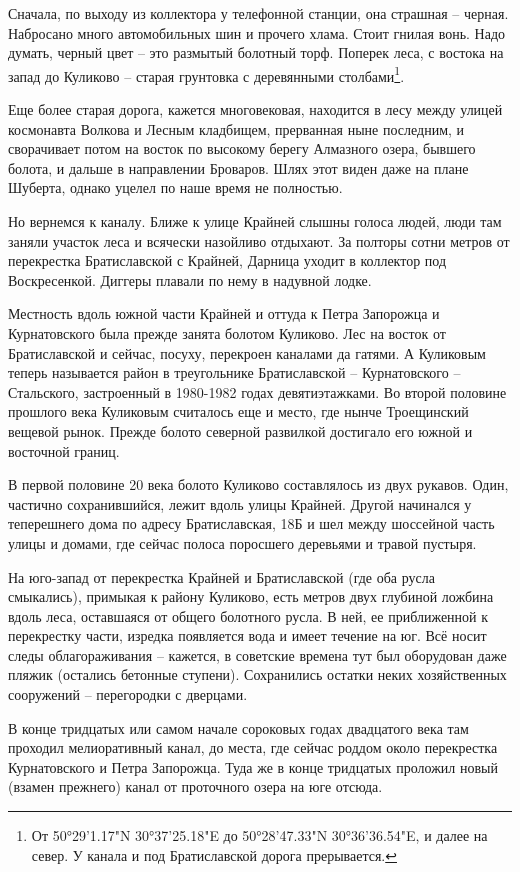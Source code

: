 Сначала, по выходу из коллектора у телефонной станции, она страшная – черная. Набросано много автомобильных шин и прочего хлама. Стоит гнилая вонь. Надо думать, черный цвет – это размытый болотный торф. Поперек леса, с востока на запад до Куликово – старая грунтовка с деревянными столбами\footnote{От 50°29'1.17"N 30°37'25.18"E до 50°28'47.33"N 30°36'36.54"E, и далее на север. У канала и под Братиславской дорога прерывается.}. 

Еще более старая дорога, кажется многовековая, находится в лесу между улицей космонавта Волкова и Лесным кладбищем, прерванная ныне последним, и сворачивает потом на восток по высокому берегу Алмазного озера, бывшего болота, и дальше в направлении Броваров. Шлях этот виден даже на плане Шуберта, однако уцелел по наше время не полностью.

Но вернемся к каналу. Ближе к улице Крайней слышны голоса людей, люди там заняли участок леса и всячески назойливо отдыхают. За полторы сотни метров от перекрестка Братиславской с Крайней, Дарница уходит в коллектор под Воскресенкой. Диггеры плавали по нему в надувной лодке.

Местность вдоль южной части Крайней и оттуда к Петра Запорожца и Курнатовского была прежде занята болотом Куликово. Лес на восток от Братиславской и сейчас, посуху, перекроен каналами да гатями. А Куликовым теперь называется район в треугольнике Братиславской – Курнатовского – Стальского, застроенный в 1980-1982 годах девятиэтажками. Во второй половине прошлого века Куликовым считалось еще и место, где нынче Троещинский вещевой рынок. Прежде болото северной развилкой достигало его южной и восточной границ.

В первой половине 20 века болото Куликово составлялось из двух рукавов. Один, частично сохранившийся, лежит вдоль улицы Крайней. Другой начинался у теперешнего дома по адресу Братиславская, 18Б и шел между шоссейной часть улицы и домами, где сейчас полоса поросшего деревьями и травой пустыря. 

На юго-запад от перекрестка Крайней и Братиславской (где оба русла смыкались), примыкая к району Куликово, есть метров двух глубиной ложбина вдоль леса, оставшаяся от общего болотного русла. В ней, ее приближенной к перекрестку части, изредка появляется вода и имеет течение на юг. Всё носит следы облагораживания – кажется, в советские времена тут был оборудован даже пляжик (остались бетонные ступени). Сохранились остатки неких хозяйственных сооружений – перегородки с дверцами.

В конце тридцатых или самом начале сороковых годах двадцатого века там проходил мелиоративный канал, до места, где сейчас роддом около перекрестка Курнатовского и Петра Запорожца. Туда же в конце тридцатых проложил новый (взамен прежнего) канал от проточного озера на юге отсюда.

